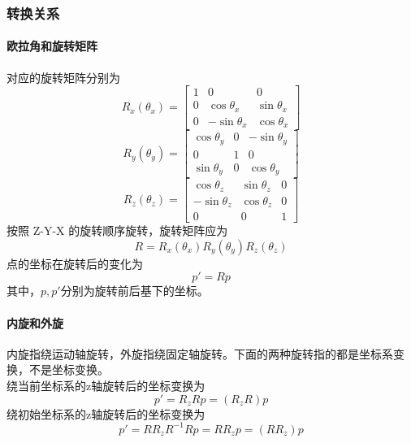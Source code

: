 \documentclass{ctexart}
\begin{document}
	\subsubsection{转换关系}
	\paragraph{欧拉角和旋转矩阵}
	对应的旋转矩阵分别为
	\begin{equation}
	R_x(\theta_x)=
	\begin{bmatrix}
	1 & 0 & 0 \\
	0 & \cos \theta_x & \sin \theta_x \\
	0 & -\sin \theta_x & \cos \theta_x
	\end{bmatrix}
	\end{equation}
	\begin{equation}
	R_y(\theta_y)=
	\begin{bmatrix}
	\cos \theta_y & 0 & -\sin \theta_y \\
	0 & 1 & 0 \\
	\sin \theta_y & 0 & \cos \theta_y
	\end{bmatrix}
	\end{equation}
	\begin{equation}
	R_z(\theta_z)=
	\begin{bmatrix}
	\cos \theta_z & \sin \theta_z & 0 \\
	-\sin \theta_z & \cos \theta_z & 0 \\
	0 & 0 & 1
	\end{bmatrix}
	\end{equation}
	按照 Z-Y-X 的旋转顺序旋转，旋转矩阵应为
	\begin{equation}
	R=R_x(\theta_x) R_y(\theta_y) R_z(\theta_z)
	\end{equation}
	点的坐标在旋转后的变化为
	\begin{equation}
	p' = R p
	\end{equation}
	其中，$p,p'$分别为旋转前后基下的坐标。
	\paragraph{内旋和外旋}
	内旋指绕运动轴旋转，外旋指绕固定轴旋转。下面的两种旋转指的都是坐标系变换，不是坐标变换。
	\\
	绕当前坐标系的z轴旋转后的坐标变换为
	\begin{equation}
	p' = R_z R p = (R_z R) p
	\end{equation}	
	绕初始坐标系的z轴旋转后的坐标变换为
	\begin{equation}
	p' = R R_z R^{-1} R p = R R_z p = (R R_z) p
	\end{equation}
\end{document}
